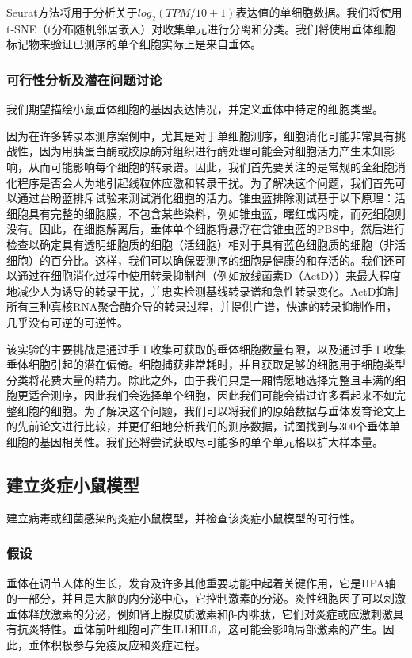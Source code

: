 \documentclass[class = opening]{whuthesis}
\begin{document}
  Seurat方法将用于分析关于$log_{2}(TPM/10+1)$表达值的单细胞数据。我们将使用t-SNE（t分布随机邻居嵌入）对收集单元进行分离和分类。我们将使用垂体细胞标记物来验证已测序的单个细胞实际上是来自垂体。

\subsubsection{可行性分析及潜在问题讨论}
  我们期望描绘小鼠垂体细胞的基因表达情况，并定义垂体中特定的细胞类型。

  因为在许多转录本测序案例中，尤其是对于单细胞测序，细胞消化可能非常具有挑战性，因为用胰蛋白酶或胶原酶对组织进行酶处理可能会对细胞活力产生未知影响，从而可能影响每个细胞的转录谱。因此，我们首先要关注的是常规的全细胞消化程序是否会人为地引起线粒体应激和转录干扰。为了解决这个问题，我们首先可以通过台盼蓝排斥试验来测试消化细胞的活力。锥虫蓝排除测试基于以下原理：活细胞具有完整的细胞膜，不包含某些染料，例如锥虫蓝，曙红或丙啶，而死细胞则没有。因此，在细胞解离后，垂体单个细胞将悬浮在含锥虫蓝的PBS中，然后进行检查以确定具有透明细胞质的细胞（活细胞）相对于具有蓝色细胞质的细胞（非活细胞）的百分比。这样，我们可以确保要测序的细胞是健康的和存活的。我们还可以通过在细胞消化过程中使用转录抑制剂（例如放线菌素D（ActD））来最大程度地减少人为诱导的转录干扰，并忠实检测基线转录谱和急性转录变化。ActD抑制所有三种真核RNA聚合酶介导的转录过程，并提供广谱，快速的转录抑制作用，几乎没有可逆的可逆性。

  该实验的主要挑战是通过手工收集可获取的垂体细胞数量有限，以及通过手工收集垂体细胞引起的潜在偏倚。细胞捕获非常耗时，并且获取足够的细胞用于细胞类型分类将花费大量的精力。除此之外，由于我们只是一厢情愿地选择完整且丰满的细胞更适合测序，因此我们会选择单个细胞，因此我们可能会错过许多看起来不如完整细胞的细胞。为了解决这个问题，我们可以将我们的原始数据与垂体发育论文上的先前论文进行比较，并更仔细地分析我们的测序数据，试图找到与300个垂体单细胞的基因相关性。我们还将尝试获取尽可能多的单个单元格以扩大样本量。

\subsection{建立炎症小鼠模型}
  建立病毒或细菌感染的炎症小鼠模型，并检查该炎症小鼠模型的可行性。
\subsubsection{假设}
  垂体在调节人体的生长，发育及许多其他重要功能中起着关键作用，它是HPA轴的一部分，并且是大脑的内分泌中心，它控制激素的分泌。炎性细胞因子可以刺激垂体释放激素的分泌，例如肾上腺皮质激素和β-内啡肽，它们对炎症或应激刺激具有抗炎特性。垂体前叶细胞可产生IL1和IL6，这可能会影响局部激素的产生。因此，垂体积极参与免疫反应和炎症过程。
\end{document}
